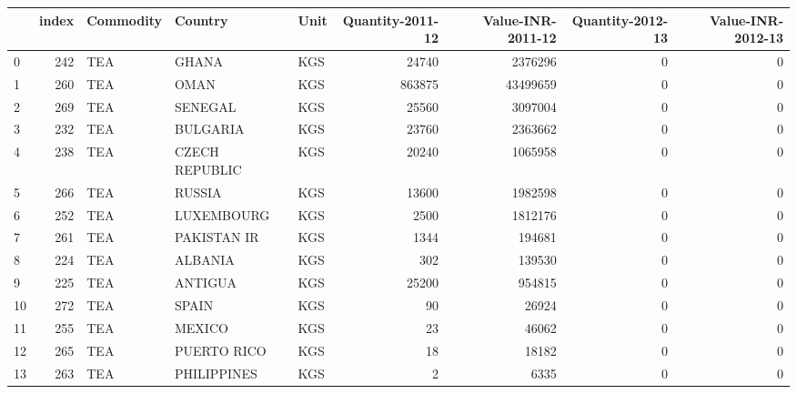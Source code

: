 \begin{tabular}{lrlllrrrr}
\toprule
{} &  index & Commodity &          Country & Unit &  Quantity-2011-12 &  Value-INR-2011-12 &  Quantity-2012-13 &  Value-INR-2012-13 \\
\midrule
0  &    242 &       TEA &            GHANA &  KGS &             24740 &            2376296 &                 0 &                  0 \\
1  &    260 &       TEA &             OMAN &  KGS &            863875 &           43499659 &                 0 &                  0 \\
2  &    269 &       TEA &          SENEGAL &  KGS &             25560 &            3097004 &                 0 &                  0 \\
3  &    232 &       TEA &         BULGARIA &  KGS &             23760 &            2363662 &                 0 &                  0 \\
4  &    238 &       TEA &   CZECH REPUBLIC &  KGS &             20240 &            1065958 &                 0 &                  0 \\
5  &    266 &       TEA &           RUSSIA &  KGS &             13600 &            1982598 &                 0 &                  0 \\
6  &    252 &       TEA &       LUXEMBOURG &  KGS &              2500 &            1812176 &                 0 &                  0 \\
7  &    261 &       TEA &      PAKISTAN IR &  KGS &              1344 &             194681 &                 0 &                  0 \\
8  &    224 &       TEA &          ALBANIA &  KGS &               302 &             139530 &                 0 &                  0 \\
9  &    225 &       TEA &          ANTIGUA &  KGS &             25200 &             954815 &                 0 &                  0 \\
10 &    272 &       TEA &            SPAIN &  KGS &                90 &              26924 &                 0 &                  0 \\
11 &    255 &       TEA &           MEXICO &  KGS &                23 &              46062 &                 0 &                  0 \\
12 &    265 &       TEA &      PUERTO RICO &  KGS &                18 &              18182 &                 0 &                  0 \\
13 &    263 &       TEA &      PHILIPPINES &  KGS &                 2 &               6335 &                 0 &                  0 \\

\end{tabular}

